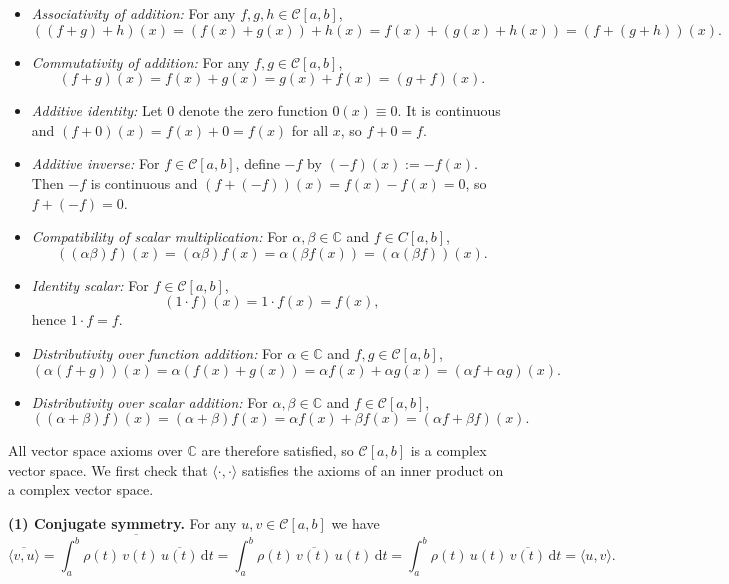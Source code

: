 \documentclass[a4paper]{article}
\begin{document}
\begin{itemize}
  \item \emph{Associativity of addition:}
        For any \(f,g,h\in \mathcal{C}[a,b]\),
        \[
        ((f+g)+h)(x)
        = (f(x)+g(x))+h(x)
        = f(x)+(g(x)+h(x))
        = (f+(g+h))(x).
        \]
  \item \emph{Commutativity of addition:}
        For any \(f,g\in \mathcal{C}[a,b]\),
        \[
        (f+g)(x)=f(x)+g(x)=g(x)+f(x)=(g+f)(x).
        \]
  \item \emph{Additive identity:}
        Let \(0\) denote the zero function
        \(0(x)\equiv 0\).
        It is continuous and
        \((f+0)(x)=f(x)+0=f(x)\) for all \(x\), so \(f+0=f\).
  \item \emph{Additive inverse:}
        For \(f\in \mathcal{C}[a,b]\), define \(-f\) by
        \((-f)(x):=-f(x)\). Then \(-f\) is continuous and
        \((f+(-f))(x)=f(x)-f(x)=0\), so \(f+(-f)=0\).
  \item \emph{Compatibility of scalar multiplication:}
        For \(\alpha,\beta\in\mathbb{C}\) and \(f\in C[a,b]\),
        \[
        ((\alpha\beta)f)(x)
        =(\alpha\beta)f(x)
        =\alpha(\beta f(x))
        =(\alpha(\beta f))(x).
        \]
  \item \emph{Identity scalar:}
        For \(f\in \mathcal{C}[a,b]\),
        \[
        (1\cdot f)(x)=1\cdot f(x)=f(x),
        \]
        hence \(1\cdot f=f\).
  \item \emph{Distributivity over function addition:}
        For \(\alpha\in\mathbb{C}\) and \(f,g\in \mathcal{C}[a,b]\),
        \[
        (\alpha(f+g))(x)
          =\alpha(f(x)+g(x))
          =\alpha f(x)+\alpha g(x)
          =(\alpha f+\alpha g)(x).
        \]
  \item \emph{Distributivity over scalar addition:}
        For \(\alpha,\beta\in\mathbb{C}\) and \(f\in \mathcal{C}[a,b]\),
        \[
        ((\alpha+\beta)f)(x)
          =(\alpha+\beta)f(x)
          =\alpha f(x)+\beta f(x)
          =(\alpha f+\beta f)(x).
        \]
\end{itemize}

All vector space axioms over \(\mathbb{C}\) are therefore satisfied,
so \(\mathcal{C}   [a,b]\) is a complex vector space.
We first check that \(\langle\cdot,\cdot\rangle\) satisfies the axioms of
an inner product on a complex vector space.

\medskip\noindent
\textbf{(1) Conjugate symmetry.}
For any \(u,v \in \mathcal{C}[a,b]\) we have
\[
\overline{\langle v,u\rangle}
  = \overline{\int_a^b \rho(t)\,v(t)\,\overline{u(t)}\,\mathrm{d}t}
  = \int_a^b \rho(t)\,\overline{v(t)}\,u(t)\,\mathrm{d}t
  = \int_a^b \rho(t)\,u(t)\,\overline{v(t)}\,\mathrm{d}t
  = \langle u,v\rangle .
\]
\end{document}
